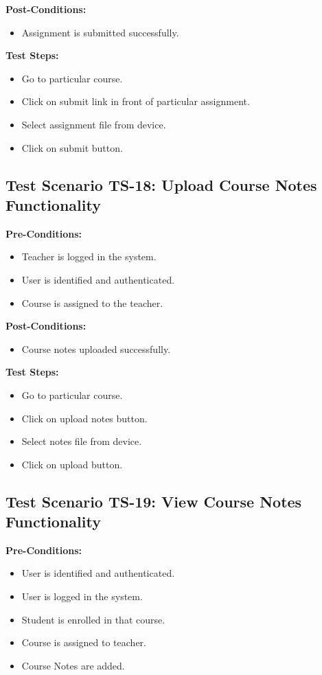 \textbf{Post-Conditions: }
\begin{itemize}

\item Assignment is submitted successfully.

\end{itemize}
\textbf{Test Steps:}
\begin{itemize}

\item Go to particular course.
\item Click on submit link in front of particular assignment.
\item Select assignment file from device.
\item Click on submit button.

\end{itemize}


\subsection{Test Scenario TS-18: Upload Course Notes Functionality}
\textbf{Pre-Conditions: }
\begin{itemize}

\item Teacher is logged in the system.
\item User is identified and authenticated.
\item Course is assigned to the teacher.

\end{itemize}

\textbf{Post-Conditions: }
\begin{itemize}

\item Course notes uploaded successfully.

\end{itemize}
\textbf{Test Steps:}
\begin{itemize}

\item Go to particular course.
\item Click on upload notes button.
\item Select notes file from device.
\item Click on upload button.

\end{itemize}



\subsection{Test Scenario TS-19: View Course Notes Functionality}
\textbf{Pre-Conditions: }
\begin{itemize}

\item User is identified and authenticated.
\item User is logged in the system.
\item Student is enrolled in that course.
\item Course is assigned to teacher.
\item Course Notes are added.

\end{itemize}

